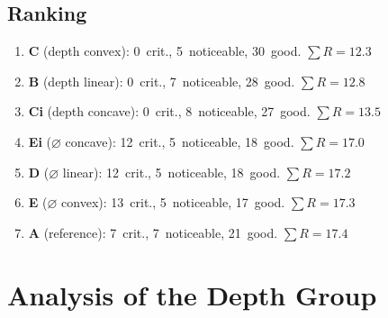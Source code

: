 \documentclass[11pt,a4paper]{article}
\begin{document}
\begin{table}[H]
\centering\small
{}
\caption{Main comparison. Bold: variant C (best result).}
\end{table}

\subsection{Ranking}

\begin{enumerate}
\item \textbf{C} (depth convex): 0~crit., 5~noticeable, 30~good. $\sum R = 12{.}3$
\item \textbf{B} (depth linear): 0~crit., 7~noticeable, 28~good. $\sum R = 12{.}8$
\item \textbf{Ci} (depth concave): 0~crit., 8~noticeable, 27~good. $\sum R = 13{.}5$
\item \textbf{Ei} ($\varnothing$ concave): 12~crit., 5~noticeable, 18~good. $\sum R = 17{.}0$
\item \textbf{D} ($\varnothing$ linear): 12~crit., 5~noticeable, 18~good. $\sum R = 17{.}2$
\item \textbf{E} ($\varnothing$ convex): 13~crit., 5~noticeable, 17~good. $\sum R = 17{.}3$
\item \textbf{A} (reference): 7~crit., 7~noticeable, 21~good. $\sum R = 17{.}4$
\end{enumerate}

\section{Analysis of the Depth Group}
\end{document}
